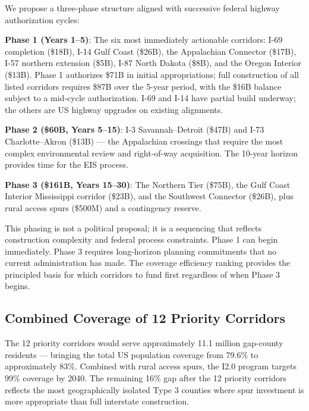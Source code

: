 We propose a three-phase structure aligned with successive federal highway authorization cycles:

\textbf{Phase 1 (Years 1--5)}: The six most immediately actionable corridors: I-69 completion (\$18B), I-14 Gulf Coast (\$26B), the Appalachian Connector (\$17B), I-57 northern extension (\$5B), I-87 North Dakota (\$8B), and the Oregon Interior (\$13B). Phase 1 authorizes \$71B in initial appropriations; full construction of all listed corridors requires \$87B over the 5-year period, with the \$16B balance subject to a mid-cycle authorization. I-69 and I-14 have partial build underway; the others are US highway upgrades on existing alignments.

\textbf{Phase 2 (\$60B, Years 5--15)}: I-3 Savannah--Detroit (\$47B) and I-73 Charlotte--Akron (\$13B) --- the Appalachian crossings that require the most complex environmental review and right-of-way acquisition. The 10-year horizon provides time for the EIS process.

\textbf{Phase 3 (\$161B, Years 15--30)}: The Northern Tier (\$75B), the Gulf Coast Interior Mississippi corridor (\$23B), and the Southwest Connector (\$26B), plus rural access spurs (\$500M) and a contingency reserve.

This phasing is not a political proposal; it is a sequencing that reflects construction complexity and federal process constraints. Phase 1 can begin immediately. Phase 3 requires long-horizon planning commitments that no current administration has made. The coverage efficiency ranking provides the principled basis for which corridors to fund first regardless of when Phase 3 begins.

\subsection{Combined Coverage of 12 Priority Corridors}

The 12 priority corridors would serve approximately 11.1 million gap-county residents --- bringing the total US population coverage from 79.6\% to approximately 83\%. Combined with rural access spurs, the I2.0 program targets 99\% coverage by 2040. The remaining 16\% gap after the 12 priority corridors reflects the most geographically isolated Type 3 counties where spur investment is more appropriate than full interstate construction.
